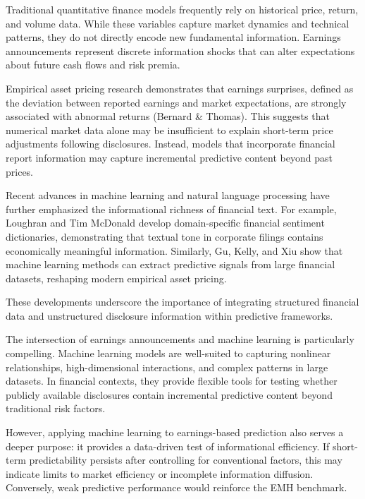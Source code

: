 Traditional quantitative finance models frequently rely on historical price, return, and volume data. While these variables capture market dynamics and technical patterns, they do not directly encode new fundamental information. 
Earnings announcements represent discrete information shocks that can alter expectations about future cash flows and risk premia.

Empirical asset pricing research demonstrates that earnings surprises, defined as the deviation between reported earnings and market expectations, are strongly associated with abnormal returns (Bernard \& Thomas\cite{pead}). 
This suggests that numerical market data alone may be insufficient to explain short-term price adjustments following disclosures. Instead, models that incorporate financial report information may capture incremental predictive content beyond past prices.

Recent advances in machine learning and natural language processing have further emphasized the informational richness of financial text. 
For example, Loughran and Tim McDonald\cite{textual-analysis-dictionaries-and-10ks} develop domain-specific financial sentiment dictionaries, demonstrating that textual tone in corporate filings contains economically meaningful information. 
Similarly, Gu, Kelly, and Xiu\cite{empirical-asset-pricing-via-machine-learning} show that machine learning methods can extract predictive signals from large financial datasets, reshaping modern empirical asset pricing.

These developments underscore the importance of integrating structured financial data and unstructured disclosure information within predictive frameworks.

The intersection of earnings announcements and machine learning is particularly compelling. Machine learning models are well-suited to capturing nonlinear relationships, high-dimensional interactions, and complex patterns in large datasets. In financial contexts, they provide flexible tools for testing whether publicly available disclosures contain incremental predictive content beyond traditional risk factors.

However, applying machine learning to earnings-based prediction also serves a deeper purpose: it provides a data-driven test of informational efficiency. If short-term predictability persists after controlling for conventional factors, this may indicate limits to market efficiency or incomplete information diffusion. Conversely, weak predictive performance would reinforce the EMH benchmark.

